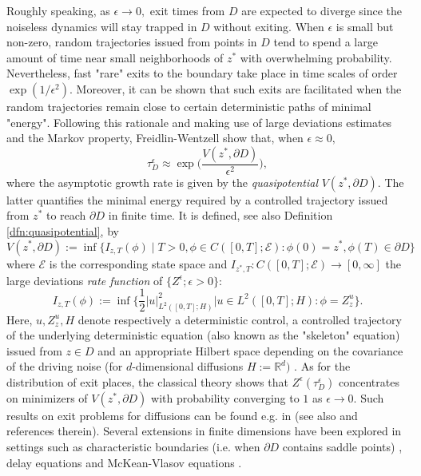 \documentclass[10pt, reqno]{amsart}
\newcommand{\R}{\mathbb{R}}
\newcommand{\e}{\mathcal{E}}
\theoremstyle{definition}
\numberwithin{lem}{section}
\numberwithin{cor}{section}
\numberwithin{prop}{section}
\numberwithin{thm}{section}
\numberwithin{dfn}{section}
\begin{document}
    Roughly speaking, as $\epsilon\to 0,$ exit times from $D$ are expected to diverge since the noiseless dynamics will stay trapped in $D$ without exiting. When $\epsilon$ is small but non-zero, random trajectories issued from points in $D$ tend to spend a large amount of time near small neighborhoods of $z^*$ with overwhelming probability. Nevertheless, fast "rare" exits to the boundary take place in time scales of order $\exp(1/\epsilon^2).$ Moreover, it can be shown that such exits are facilitated when the random trajectories remain close to certain deterministic paths of minimal "energy". Following this rationale and making use of large deviations estimates and the Markov property, Freidlin-Wentzell \cite{freidlin1998random} show that, when $\epsilon\approx 0,$
       $$ \tau_D^\epsilon\approx\exp\bigg(  \frac{V(z^*,\partial D)}{\epsilon^2}\bigg), $$
    where the asymptotic growth rate is given by the \textit{quasipotential} $V(z^*,\partial D).$ The latter quantifies the minimal energy required by a controlled trajectory issued  from $z^*$ to reach $\partial D$ in finite time. It is defined, see also Definition \ref{dfn:quasipotential}, by 
    \begin{equation}\label{eq:QuasipotentialIntro}
        V(z^*,\partial D):=\inf\bigg\{ I_{z,T}(\phi)\;\bigg|\; T>0, \phi\in C([0,T];\e): \phi(0)=z^*, \phi(T)\in\partial D    \bigg\}
    \end{equation}    
    where $\e$ is the corresponding state space and 
    $I_{z^*,T}:C([0,T];\e)\rightarrow[0,\infty]$ the large deviations \textit{rate function} of $\{Z^\epsilon; \epsilon>0\}:$
    $$  I_{z,T}(\phi):=\inf\bigg\{\frac{1}{2}|u|^2_{L^2([0,T];H)}\bigg| u\in L^2([0,T];H):  \phi=Z_z^u       \bigg\}.$$
    Here, $u, Z_z^u, H$ denote respectively a deterministic control, a controlled trajectory of the underlying deterministic equation (also known as the "skeleton" equation) issued from $z\in D$ and an appropriate Hilbert space depending on the covariance of the driving noise (for $d$-dimensional diffusions $H:=\R^d)$ . As for the distribution of exit places, the classical theory shows that $Z^\epsilon(\tau^\epsilon_D)$ concentrates on minimizers of $V(z^*,\partial D)$ with probability converging to $1$ as $\epsilon\to 0.$ Such results on exit problems for diffusions can be found e.g. in \cite[Chapter 4]{freidlin1998random} (see also \cite[Section 5.7]{dembo2009large} and references therein). Several extensions in finite dimensions have been explored in settings such as characteristic boundaries (i.e. when $\partial D$ contains saddle points) \cite{day1987recent, day1989boundary,day1990large}, delay equations \cite{lipshutz2018exit} and McKean-Vlasov equations \cite{tugaut2012exit}. 
   
\end{document}
